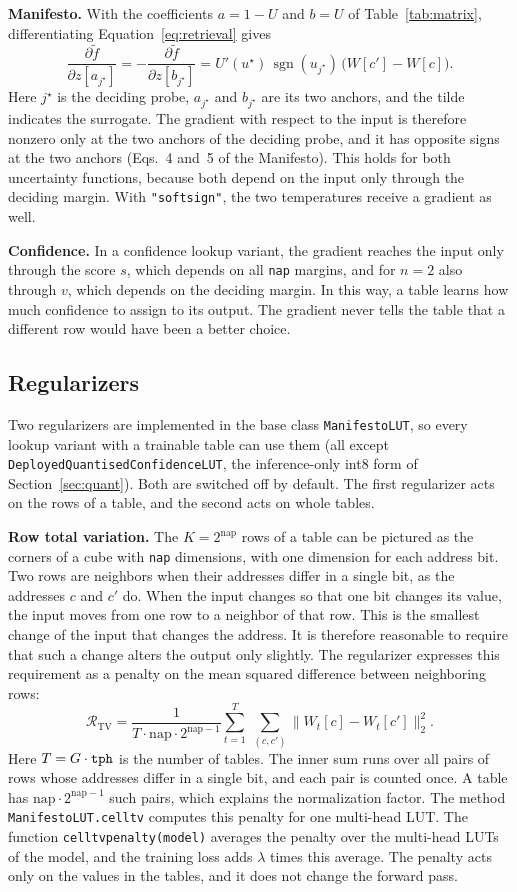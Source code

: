 \documentclass[11pt]{article}
\DeclareRobustCommand{\code}[1]{{\renewcommand{\_}{\textunderscore\allowbreak}\texttt{#1}}}
\newcommand{\sgn}{\operatorname{sgn}}
\begin{document}
\textbf{Manifesto.} With the coefficients $a=1-U$ and $b=U$ of Table~\ref{tab:matrix},
differentiating Equation~\eqref{eq:retrieval} gives
\[
  \frac{\partial\tilde f}{\partial z[a_{j^\star}]}=-\frac{\partial\tilde f}{\partial z[b_{j^\star}]}
  =U'(u^\star)\,\sgn(u_{j^\star})\,\big(W[c']-W[c]\big).
\]
Here $j^\star$ is the deciding probe, $a_{j^\star}$ and $b_{j^\star}$ are its two anchors, and the tilde
indicates the surrogate. The gradient with respect to the input is therefore nonzero only at the two
anchors of the deciding probe, and it has opposite signs at the two anchors (Eqs.~4 and~5 of the
Manifesto). This holds for both uncertainty functions, because both depend on the input only through the
deciding margin. With \code{"softsign"}, the two temperatures receive a gradient as well.

\textbf{Confidence.} In a confidence lookup variant, the gradient reaches the input only through the score $s$, which
depends on all \code{nap} margins, and for $n=2$ also through $v$, which depends on the deciding margin.
In this way, a table learns how much confidence to assign to its output. The gradient never tells the
table that a different row would have been a better choice.

\subsection{Regularizers}
\label{sec:reg}

Two regularizers are implemented in the base class \code{ManifestoLUT}, so every lookup variant with a
trainable table can use them (all except \code{DeployedQuantisedConfidenceLUT}, the inference-only int8 form
of Section~\ref{sec:quant}).
Both are switched off by default. The first regularizer acts on the rows of a table, and the second acts
on whole tables.

\textbf{Row total variation.} The $K=2^{\text{nap}}$ rows of a table can be pictured as the corners of a
cube with \code{nap} dimensions, with one dimension for each address bit. Two rows are neighbors when
their addresses differ in a single bit, as the addresses $c$ and $c'$ do. When the input changes so that
one bit changes its value, the input moves from one row to a neighbor of that row. This is the smallest
change of the input that changes the address. It is therefore reasonable to require that such a change
alters the output only slightly. The regularizer expresses this requirement as a penalty on the mean
squared difference between neighboring rows:
\[
  \mathcal R_\text{TV}=\frac{1}{T\cdot\text{nap}\cdot2^{\text{nap}-1}}
  \sum_{t=1}^{T}\ \sum_{(c,c')}\big\|W_t[c]-W_t[c']\big\|_2^2 .
\]
Here $T=G\cdot\code{tph}$ is the number of tables. The inner sum runs over all pairs of rows whose
addresses differ in a single bit, and each pair is counted once. A table has
$\text{nap}\cdot2^{\text{nap}-1}$ such pairs, which explains the normalization factor. The method
\code{ManifestoLUT.cell\_tv} computes this penalty for one multi-head LUT. The function
\code{cell\_tv\_penalty(model)} averages the penalty over the multi-head LUTs of the model, and the
training loss adds $\lambda$ times this average. The penalty acts only on the values in the tables, and
it does not change the forward pass.
\end{document}
